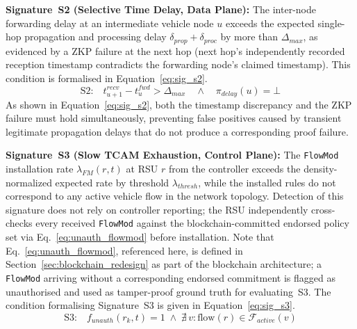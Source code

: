 \documentclass[12pt, a4paper]{report}
\begin{document}
\textbf{Signature~S2 (Selective Time Delay, Data Plane):}
The inter-node forwarding delay at an intermediate vehicle node $u$
exceeds the expected single-hop propagation and processing delay
$\delta_{prop} + \delta_{proc}$ by more than $\Delta_{max}$, as
evidenced by a ZKP failure at the next hop (next hop's independently
recorded reception timestamp contradicts the forwarding node's claimed
timestamp).
This condition is formalised in Equation~\eqref{eq:sig_s2}.
\begin{equation}
\text{S2:}\quad t^{recv}_{u+1} - t^{fwd}_{u} > \Delta_{max}
\quad \land \quad \pi_{delay}(u) = \bot
\label{eq:sig_s2}
\end{equation}
As shown in Equation~\eqref{eq:sig_s2}, both the timestamp
discrepancy and the ZKP failure must hold simultaneously, preventing
false positives caused by transient legitimate propagation delays that
do not produce a corresponding proof failure.

\textbf{Signature~S3 (Slow TCAM Exhaustion, Control Plane):}
The \texttt{FlowMod} installation rate $\lambda_{FM}(r,t)$ at RSU $r$
from the controller exceeds the density-normalized expected rate by
threshold $\lambda_{thresh}$, while the installed rules do not
correspond to any active vehicle flow in the network topology.
Detection of this signature does not rely on controller reporting;
the RSU independently cross-checks every received \texttt{FlowMod}
against the blockchain-committed endorsed policy set via
Eq.~\eqref{eq:unauth_flowmod} before installation.
Note that Eq.~\eqref{eq:unauth_flowmod}, referenced here, is
defined in Section~\eqref{sec:blockchain_redesign} as part of the blockchain
architecture; a \texttt{FlowMod} arriving without a corresponding
endorsed commitment is flagged as unauthorised and used as
tamper-proof ground truth for evaluating~S3.
The condition formalising Signature~S3 is given in
Equation~\eqref{eq:sig_s3}.
\begin{equation}
\text{S3:}\quad
f_{unauth}(r_k, t) = 1
\;\land\;
\nexists\, v : \text{flow}(r) \in
\mathcal{F}_{active}(v)
\label{eq:sig_s3}
\end{equation}
\end{document}
